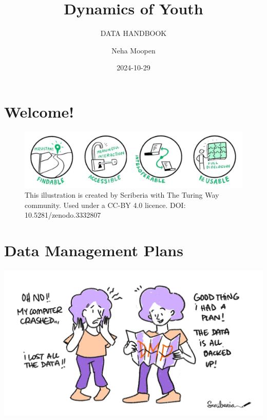 \documentclass[
  letterpaper,
  DIV=11,
  numbers=noendperiod]{scrreprt}
\title{Dynamics of Youth}
\subtitle{DATA HANDBOOK}
\author{Neha Moopen}
\date{2024-10-29}
\renewcommand*\contentsname{Table of contents}
\newcommand\contentsname{Table of contents}
\begin{document}
\maketitle

\renewcommand*\contentsname{Table of contents}
{
\hypersetup{linkcolor=}
\setcounter{tocdepth}{2}
\tableofcontents
}


\chapter*{Welcome!}\label{welcome}


\begin{figure}[H]

{\centering \includegraphics{images/fair-1x4.png}

}

\caption{This illustration is created by Scriberia with The Turing Way
community. Used under a CC-BY 4.0 licence. DOI: 10.5281/zenodo.3332807}

\end{figure}%


\chapter*{Data Management Plans}\label{data-management-plans}


\includegraphics{images/data-management-plan.jpg}
\end{document}
